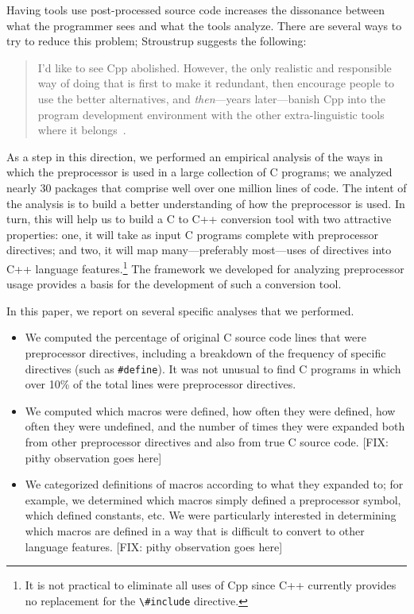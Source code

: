 Having tools use post-processed source code increases the dissonance
between what the programmer sees and what the tools analyze.  There
are several ways to try to reduce this problem; Stroustrup suggests
the following:

\begin{quote}
I'd like to see Cpp abolished.  However, the only realistic and
responsible way of doing that is first to make it redundant, then
encourage people to use the better alternatives, and {\em
then\/}---years later---banish Cpp into the program development
environment with the other extra-linguistic tools where it
belongs~\cite[p.~426]{Stroustrup-DesignEvolution}.
\end{quote}

As a step in this direction, we performed an empirical analysis of the
ways in which the preprocessor is used in a large collection of C
programs; we analyzed nearly 30 packages that comprise well over one
million lines of code.  The intent of the analysis is to build a
better understanding of how the preprocessor is used.  In turn, this
will help us to build a C to C++ conversion tool with two attractive
properties: one, it will take as input C programs complete with
preprocessor directives; and two, it will map many---preferably
most---uses of directives into C++ language features.\footnote{It is
not practical to eliminate all uses of Cpp since C++ currently
provides no replacement for the \verb+\#include+ directive.}  The
framework we developed for analyzing preprocessor usage provides a
basis for the development of such a conversion tool.

In this paper, we report on several specific analyses that we
performed.  
\begin{itemize}

\item We computed the percentage of original C source code lines that
were preprocessor directives, including a breakdown of the frequency
of specific directives (such as \verb+#define+).  It was not unusual
to find C programs in which over 10\% of the total lines were
preprocessor directives.

\item We computed which macros were defined, how often they were
defined, how often they were undefined, and the number of times they
were expanded both from other preprocessor directives and also from
true C source code.  [FIX: pithy observation goes here]

\item We categorized definitions of macros according to what they
      expanded to; for example, we determined which macros simply
      defined a preprocessor symbol, which defined constants, etc.  We
      were particularly interested in determining which macros are
      defined in a way that is difficult to convert to other language
      features.  [FIX: pithy observation goes here]

\end{itemize}

